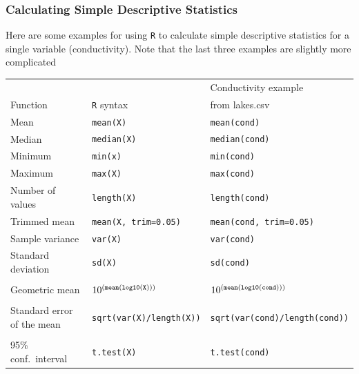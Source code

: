 \documentclass[10pt]{beamer}
\begin{document}
\begin{frame}[fragile]
\frametitle{Calculating Simple Descriptive Statistics}

Here are some examples for using {\color{red} \tt R} to calculate
simple descriptive statistics for a single variable (conductivity).
Note that the last three examples are slightly more complicated

{\scriptsize
\begin{tabular}{lll}
                    &                                & Conductivity example\\
Function            & {\color{red} \tt R} syntax     & from lakes.csv\\\hline
Mean                & {\color{red} \tt mean(X)}      & {\color{red} \tt mean(cond)}\\
Median              & {\color{red} \tt median(X)}    & {\color{red} \tt median(cond)}\\ 
Minimum             & {\color{red} \tt min(x)}       & {\color{red} \tt min(cond)}\\
Maximum             & {\color{red} \tt max(X)}       & {\color{red} \tt max(cond)}\\
Number of values    & {\color{red} \tt length(X)}    & {\color{red} \tt length(cond)}\\
Trimmed mean        & {\color{red} \tt mean(X, trim=0.05)} & {\color{red} \tt mean(cond, trim=0.05)}\\
Sample variance     & {\color{red} \tt var(X)}                  & {\color{red} \tt var(cond)} \\
Standard deviation  & {\color{red} \tt sd(X)}                   & {\color{red} \tt sd(cond)}\\
                    &                                           & \\
Geometric mean      & {\color{red} \tt $10^{(\tt mean(log10(X)))}$} & {\color{red} $10^{(\tt mean(log10(cond)))}$}\\
                    &                                           & \\
Standard error of the mean & {\color{red} \tt sqrt(var(X)/length(X))} & {\color{red} \tt sqrt(var(cond)/length(cond))}\\
                    &                                           & \\
95\% conf.~interval & {\color{red} \tt t.test(X)}               & {\color{red} \tt t.test(cond)}\\\hline
\end{tabular}
}

\end{frame}
\end{document}
